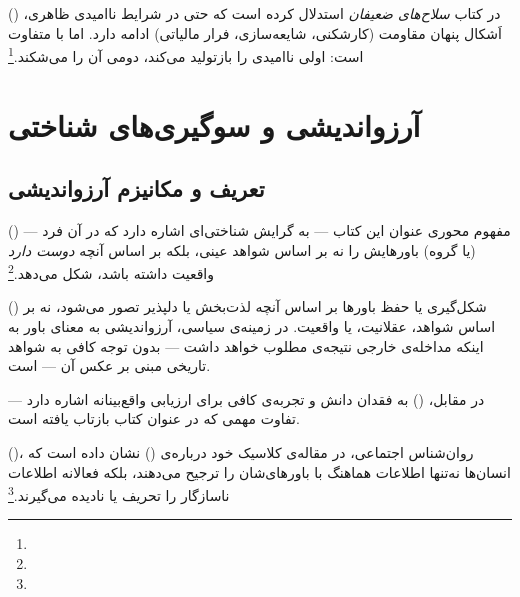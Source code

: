  () در کتاب \textit{سلاح‌های ضعیفان} استدلال کرده است که حتی در شرایط ناامیدی ظاهری، اَشکال پنهان مقاومت (کارشکنی، شایعه‌سازی، فرار مالیاتی) ادامه دارد. اما  با  متفاوت است: اولی ناامیدی را بازتولید می‌کند، دومی آن را می‌شکند.\footnote{}


\section{آرزواندیشی و سوگیری‌های شناختی}
\label{sec:ch11-wishful-thinking}

\subsection{تعریف و مکانیزم آرزواندیشی}
\label{subsec:ch11-wishful-definition}

 () — مفهوم محوری عنوان این کتاب — به گرایش شناختی‌ای اشاره دارد که در آن فرد (یا گروه) باورهایش را نه بر اساس شواهد عینی، بلکه بر اساس آنچه \textit{دوست دارد} واقعیت داشته باشد، شکل می‌دهد.\footnote{}

\begin{tcolorbox}[defbox, title={تعریف: آرزواندیشی}]
 () شکل‌گیری یا حفظ باورها بر اساس آنچه لذت‌بخش یا دلپذیر تصور می‌شود، نه بر اساس شواهد، عقلانیت، یا واقعیت. در زمینه‌ی سیاسی، آرزواندیشی به معنای باور به اینکه مداخله‌ی خارجی نتیجه‌ی مطلوب خواهد داشت — بدون توجه کافی به شواهد تاریخی مبنی بر عکس آن — است.

در مقابل،  () به فقدان دانش و تجربه‌ی کافی برای ارزیابی واقع‌بینانه اشاره دارد — تفاوت مهمی که در عنوان کتاب بازتاب یافته است.
\end{tcolorbox}

 ()، روان‌شناس اجتماعی، در مقاله‌ی کلاسیک خود درباره‌ی  () نشان داده است که انسان‌ها نه‌تنها اطلاعات هماهنگ با باورهای‌شان را ترجیح می‌دهند، بلکه فعالانه اطلاعات ناسازگار را تحریف یا نادیده می‌گیرند.\footnote{}

